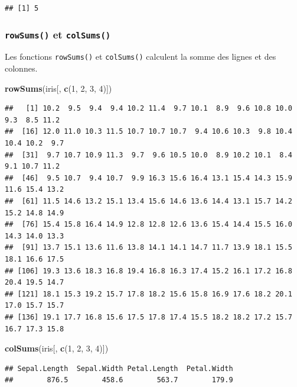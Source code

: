 \documentclass[
]{book}
\newenvironment{Shaded}{\begin{snugshade}}{\end{snugshade}}
\newcommand{\DecValTok}[1]{\textcolor[rgb]{0.00,0.00,0.81}{#1}}
\newcommand{\KeywordTok}[1]{\textcolor[rgb]{0.13,0.29,0.53}{\textbf{#1}}}
\newcommand{\NormalTok}[1]{#1}
\begin{document}
\begin{verbatim}
## [1] 5
\end{verbatim}

\hypertarget{l015rowsums}{%
\subsubsection{\texorpdfstring{\texttt{rowSums()} et \texttt{colSums()}}{rowSums() et colSums()}}\label{l015rowsums}}

Les fonctions \texttt{rowSums()} et \texttt{colSums()} calculent la somme des lignes et des colonnes.

\begin{Shaded}
\begin{Highlighting}[]
\KeywordTok{rowSums}\NormalTok{(iris[, }\KeywordTok{c}\NormalTok{(}\DecValTok{1}\NormalTok{, }\DecValTok{2}\NormalTok{, }\DecValTok{3}\NormalTok{, }\DecValTok{4}\NormalTok{)])}
\end{Highlighting}
\end{Shaded}

\begin{verbatim}
##   [1] 10.2  9.5  9.4  9.4 10.2 11.4  9.7 10.1  8.9  9.6 10.8 10.0  9.3  8.5 11.2
##  [16] 12.0 11.0 10.3 11.5 10.7 10.7 10.7  9.4 10.6 10.3  9.8 10.4 10.4 10.2  9.7
##  [31]  9.7 10.7 10.9 11.3  9.7  9.6 10.5 10.0  8.9 10.2 10.1  8.4  9.1 10.7 11.2
##  [46]  9.5 10.7  9.4 10.7  9.9 16.3 15.6 16.4 13.1 15.4 14.3 15.9 11.6 15.4 13.2
##  [61] 11.5 14.6 13.2 15.1 13.4 15.6 14.6 13.6 14.4 13.1 15.7 14.2 15.2 14.8 14.9
##  [76] 15.4 15.8 16.4 14.9 12.8 12.8 12.6 13.6 15.4 14.4 15.5 16.0 14.3 14.0 13.3
##  [91] 13.7 15.1 13.6 11.6 13.8 14.1 14.1 14.7 11.7 13.9 18.1 15.5 18.1 16.6 17.5
## [106] 19.3 13.6 18.3 16.8 19.4 16.8 16.3 17.4 15.2 16.1 17.2 16.8 20.4 19.5 14.7
## [121] 18.1 15.3 19.2 15.7 17.8 18.2 15.6 15.8 16.9 17.6 18.2 20.1 17.0 15.7 15.7
## [136] 19.1 17.7 16.8 15.6 17.5 17.8 17.4 15.5 18.2 18.2 17.2 15.7 16.7 17.3 15.8
\end{verbatim}

\begin{Shaded}
\begin{Highlighting}[]
\KeywordTok{colSums}\NormalTok{(iris[, }\KeywordTok{c}\NormalTok{(}\DecValTok{1}\NormalTok{, }\DecValTok{2}\NormalTok{, }\DecValTok{3}\NormalTok{, }\DecValTok{4}\NormalTok{)])}
\end{Highlighting}
\end{Shaded}

\begin{verbatim}
## Sepal.Length  Sepal.Width Petal.Length  Petal.Width 
##        876.5        458.6        563.7        179.9
\end{verbatim}
\end{document}
